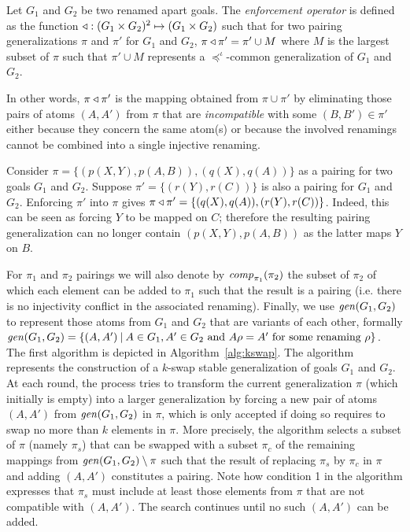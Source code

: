 \begin{definition}
	Let $G_1$ and $G_2$ be two renamed apart goals. The \emph{enforcement operator} is defined as the function $\triangleleft: (G_1\times G_2)^2 \mapsto (G_1\times G_2)$ such that for two pairing generalizations $\pi$ and $\pi'$ for $G_1$ and $G_2$, $\pi \triangleleft \pi' = \pi' \cup M$ where $M$ is the largest subset of $\pi$ such that $\pi'\cup M$ represents a $\preceq^\iota$-common generalization of $G_1$ and $G_2$. 
\end{definition}
	
In other words, $\pi\triangleleft\pi'$ is the mapping obtained from $\pi\cup\pi'$ by eliminating those pairs of atoms $(A,A')$ from $\pi$ that are \textit{incompatible} with some $(B,B')\in\pi'$ either because they concern the same atom(s) or because the involved renamings cannot be combined into a single injective renaming. 
	
\begin{example}
	Consider 
	$\pi = \{(p(X, Y), p(A, B)), (q(X), q(A))\}$ as a pairing for two goals $G_1$ and $G_2$. Suppose $\pi' = \{(r(Y), r(C))\}$ is also a pairing for $G_1$ and $G_2$. Enforcing $\pi'$ into $\pi$ gives $\pi\triangleleft\pi' = \{(q(X), q(A)), (r(Y), r(C))\}$. Indeed, this can be seen as forcing $Y$ to be mapped on $C$; therefore the resulting pairing generalization can no longer contain $(p(X, Y), p(A, B))$ as the latter maps $Y$ on $B$. 
\end{example}

For $\pi_1$ and $\pi_2$ pairings we will also denote by $\mathit{comp}_{\pi_1}(\pi_2)$ the subset of $\pi_2$ of which each element can be added to $\pi_1$ such that the result is a pairing (i.e. there is no injectivity conflict in the associated renaming). Finally, we use $\mathit{gen}(G_1, G_2)$ to represent those atoms from $G_1$ and $G_2$ that are variants of each other, formally $\mathit{gen}(G_1,G_2)=\{(A,A')\:|\:A\in G_1, A'\in G_2\mbox{ and }A\rho=A'\mbox{ for some renaming }\rho\}$. 
%
The first algorithm is depicted in Algorithm~\ref{alg:kswap}. The algorithm represents the construction of a $k$-swap stable generalization of goals $G_1$ and $G_2$. At each round, the process tries to transform the current generalization $\pi$ (which initially is empty) into a larger generalization by forcing a new pair of atoms $(A,A')$ from $\mathit{gen}(G_1,G_2)$ in $\pi$, which is only accepted if doing so requires to swap no more than $k$ elements in $\pi$. More precisely, the algorithm selects a subset of $\pi$ (namely $\pi_s$) that can be swapped with a subset $\pi_c$ of the remaining mappings from $\mathit{gen}(G_1,G_2)\setminus\pi$ such that the result of replacing $\pi_s$ by $\pi_c$ in $\pi$ and adding $(A,A')$ constitutes a pairing. Note how condition 1 in the algorithm expresses that $\pi_s$ must include at least those elements from $\pi$ that are not compatible with $(A,A')$.
The search continues until no such $(A,A')$ can be added.

